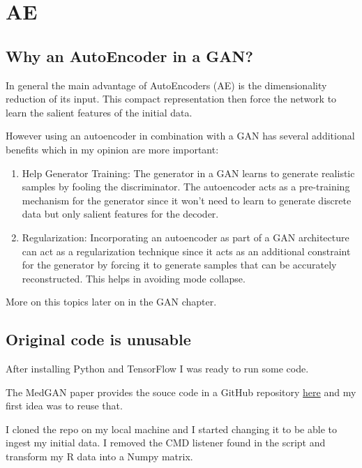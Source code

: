 \documentclass[
  letterpaper,
  DIV=11,
  numbers=noendperiod]{scrreprt}
\begin{document}
\part{AE}

\hypertarget{why-an-autoencoder-in-a-gan}{%
\chapter{Why an AutoEncoder in a
GAN?}\label{why-an-autoencoder-in-a-gan}}

In general the main advantage of AutoEncoders (AE) is the dimensionality
reduction of its input. This compact representation then force the
network to learn the salient features of the initial data.

However using an autoencoder in combination with a GAN has several
additional benefits which in my opinion are more important:

\begin{enumerate}
\def\labelenumi{\arabic{enumi}.}
\item
  Help Generator Training: The generator in a GAN learns to generate
  realistic samples by fooling the discriminator. The autoencoder acts
  as a pre-training mechanism for the generator since it won't need to
  learn to generate discrete data but only salient features for the
  decoder.
\item
  Regularization: Incorporating an autoencoder as part of a GAN
  architecture can act as a regularization technique since it acts as an
  additional constraint for the generator by forcing it to generate
  samples that can be accurately reconstructed. This helps in avoiding
  mode collapse.
\end{enumerate}

More on this topics later on in the GAN chapter.

\hypertarget{original-code-is-unusable}{%
\chapter{Original code is unusable}\label{original-code-is-unusable}}

After installing Python and TensorFlow I was ready to run some code.

The MedGAN paper provides the souce code in a GitHub repository
\href{https://github.com/mp2893/medgan}{here} and my first idea was to
reuse that.

I cloned the repo on my local machine and I started changing it to be
able to ingest my initial data. I removed the CMD listener found in the
script and transform my R data into a Numpy matrix.
\end{document}
